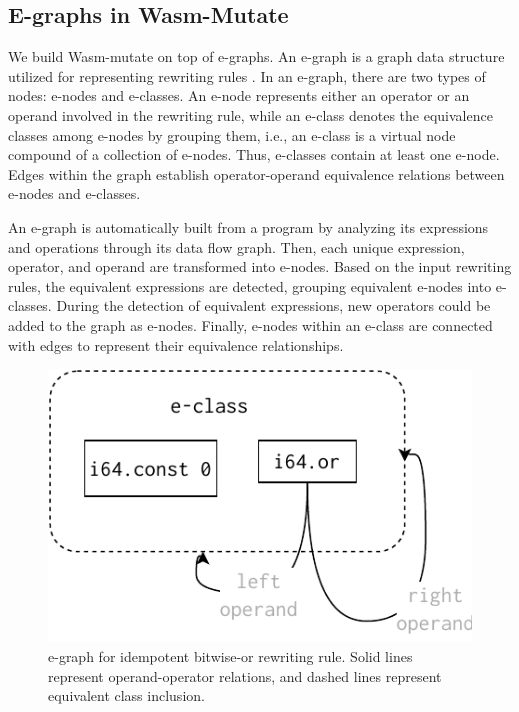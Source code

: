 \documentclass[sigplan,screen]{acmart}
\newcommand{\tool}{Wasm-mutate\xspace}
\begin{document}
\subsection{E-graphs in Wasm-Mutate}
We build \tool on top of e-graphs.
An e-graph is a graph data structure utilized for representing rewriting rules \cite{10.1145/3571207}. 
In an e-graph, there are two types of nodes: e-nodes and e-classes. 
An e-node represents either an operator or an operand involved in the rewriting rule, while an e-class denotes the equivalence classes among e-nodes by grouping them, i.e., an e-class is a virtual node compound of a collection of e-nodes. 
Thus, e-classes contain at least one e-node.
Edges within the graph establish operator-operand equivalence relations between e-nodes and e-classes.

An e-graph is automatically built from a program by analyzing its expressions and operations through its data flow graph.
Then, each unique expression, operator, and operand are transformed into e-nodes.
Based on the input rewriting rules, the equivalent expressions are detected, grouping equivalent e-nodes into e-classes.
During the detection of equivalent expressions, new operators could be added to the graph as e-nodes.
Finally, e-nodes within an e-class are connected with edges to represent their equivalence relationships.

\begin{figure}
    \centering
    \includegraphics[width=0.7\linewidth]{figures/egraph1.pdf}
    \caption{e-graph for idempotent bitwise-or rewriting rule. Solid lines represent operand-operator relations, and dashed lines represent equivalent class inclusion. }
  \label{e-graph}
\end{figure}
\end{document}
